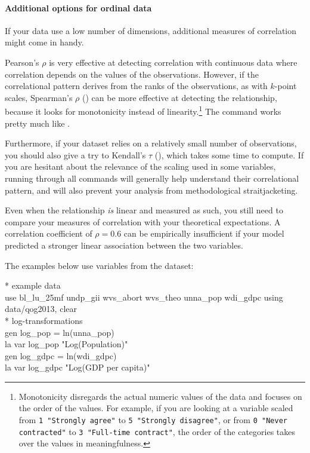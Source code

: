   \paragraph{Additional options for ordinal data} If your data use a low number of dimensions, additional measures of correlation might come in handy.

  Pearson's $\rho$ is very effective at detecting correlation with continuous data where correlation depends on the values of the observations. However, if the correlational pattern derives from the ranks of the observations, as with $k$-point scales, Spearman's $\rho$ () can be more effective at detecting the relationship, because it looks for monotonicity instead of linearity.\footnote{Monotonicity disregards the actual numeric values of the data and focuses on the order of the values. For example, if you are looking at a variable scaled from \texttt{1 "Strongly agree"} to \texttt{5 "Strongly disagree"}, or from \texttt{0 "Never contracted"} to \texttt{3 "Full-time contract"}, the order of the categories takes over the values in meaningfulness.} The command works pretty much like .

  Furthermore, if your dataset relies on a relatively small number of observations, you should also give a try to Kendall's $\tau$ (), which takes some time to compute. If you are hesitant about the relevance of the scaling used in some variables, running through all commands will generally help understand their correlational pattern, and will also prevent your analysis from methodological straitjacketing.

  Even when the relationship \emph{is} linear and measured as such, you still need to compare your measures of correlation with your theoretical expectations. A correlation coefficient of $\rho = 0.6$ can be empirically insufficient if your model predicted a stronger linear association between the two variables.

The examples below use variables from the \qog{} dataset:%

\begin{docspec}
  * example data\\%
  use bl\_lu\_25mf undp\_gii wvs\_abort wvs\_theo unna\_pop wdi\_gdpc using data/qog2013, clear\\%
  * log-transformations\\%
  gen log\_pop = ln(unna\_pop)\\%
  la var log\_pop "Log(Population)"\\%
  gen log\_gdpc = ln(wdi\_gdpc)\\%
  la var log\_gdpc "Log(GDP per capita)"
\end{docspec}


